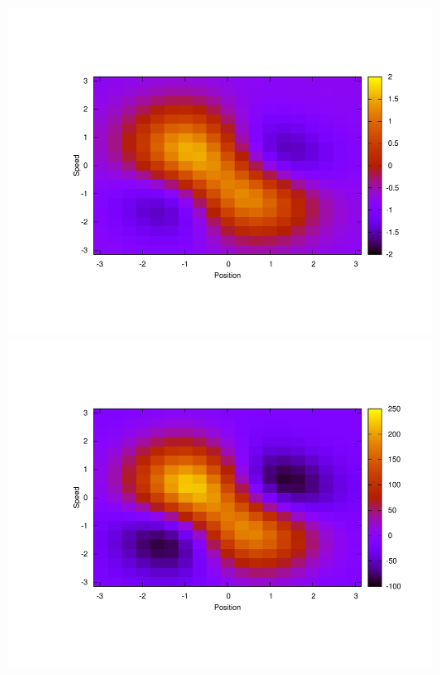 \documentclass[publibook-draft]{CAp2012}
\begin{document}
\begin{figure}
\begin{minipage}[t]{.5\linewidth}
\begin{center}
       \caption{}
       \label{lafemR.fig}
    \end{center}
\end{minipage}\\
\begin{minipage}[t]{.5\linewidth}
    \begin{center}
       \includegraphics[width=1.3\textwidth]{LAFEM_Exp3_Vexpert.pdf}
       \caption{}
       \label{trueV.fig}
    \end{center}
\end{minipage}
\hfill
\begin{minipage}[t]{.5\linewidth}
    \begin{center}
       \includegraphics[width=1.3\textwidth]{LAFEM_Exp3_Vagent.pdf}

\end{center}
\end{minipage}
\end{figure}
\end{document}
